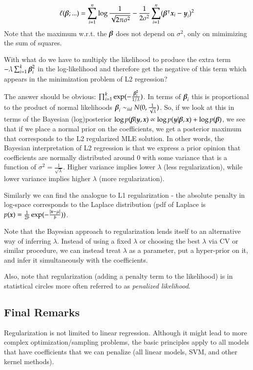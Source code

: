 \begin{refsection}
$$\ell(\boldsymbol{\beta};...) = \sum_{i=1}^n \log\frac{1}{\sqrt{2\pi\sigma^2}} - \frac{1}{2\sigma^2}\sum_{i=1}^n(\boldsymbol{\beta}^\intercal\boldsymbol{x}_i - \boldsymbol{y}_i)^2$$
%
Note that the maximum w.r.t. the $\boldsymbol{\beta}$ does not depend on $\sigma^2$, only on mimimizing the sum of squares.

With what do we have to multiply the likelihood to produce the extra term $-\lambda \sum_{i=1}^k \boldsymbol{\beta}_i^2$ in the log-likelihood and therefore get the negative of this term which appears in the minimization problem of L2 regression? 

The answer should be obvious: $\prod_{i=1}^k\exp(-\frac{\boldsymbol{\beta}_i^2}{1 / \lambda})$. In terms of $\boldsymbol{\beta}_i$ this is proportional to the product of normal likelihoods $\boldsymbol{\beta}_i \sim_{iid} N(0, \frac{1}{\sqrt{\lambda}})$. So, if we look at this in terms of the Bayesian (log)posterior $\log p(\boldsymbol{\beta} | \boldsymbol{y}, \boldsymbol{x}) \propto \log p(\boldsymbol{y} | \boldsymbol{\beta}, \boldsymbol{x}) + \log p(\boldsymbol{\beta})$, we see that if we place a normal prior on the coefficients, we get a posterior maximum that corresponds to the L2 regularized MLE solution. In other words, the Bayesian interpretation of L2 regression is that we express a prior opinion that coefficients are normally distributed around 0 with some variance that is a function of $\sigma^2 = \frac{1}{\sqrt{\lambda}}$. Higher variance implies lower $\lambda$ (less regularization), while lower variance implies higher $\lambda$ (more regularization).

Similarly we can find the analogue to L1 regularization - the absolute penalty in log-space corresponds to the Laplace distribution (pdf of Laplace is $p(\boldsymbol{x}) = \frac{1}{2b}\exp(-\frac{|\boldsymbol{x} - \mu|}{b}))$.

Note that the Bayesian approach to regularization lends itself to an alternative way of inferring $\lambda$. Instead of using a fixed $\lambda$ or choosing the best $\lambda$ via CV or similar procedure, we can instead treat $\lambda$ as a parameter, put a hyper-prior on it, and infer it simultaneously with the coefficients.

Also, note that regularization (adding a penalty term to the likelihood) is in statistical circles more often referred to as {\em penalized likelihood}.

\subsection*{Final Remarks}

Regularization is not limited to linear regression. Although it might lead to more complex optimization/sampling problems, the basic principles apply to all models that have coefficients that we can penalize (all linear models, SVM, and other kernel methods).


\end{refsection}
